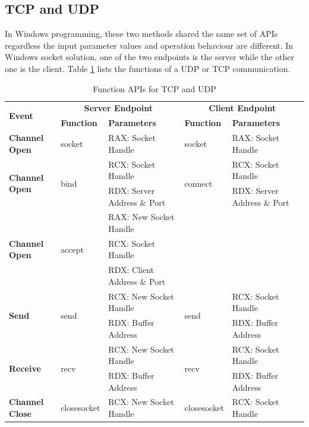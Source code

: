 \subsection{TCP and UDP}
In Windows programming, these two methods shared the same set of APIs regardless the input parameter values and operation behaviour are different. In Windows socket solution, one of the two endpoints is the server while the other one is the client. Table \ref{tcpupdfunctions} lists the functions of a UDP or TCP communication. 
  \begin{table}[H]
        \centering
        \caption{Function APIs for TCP and UDP}
        \label{tcpupdfunctions}
        \begin{tabular}{|l|l|l|l|l|}
            \hline
             \multirow{2}{*}{\textbf{Event}} &
               \multicolumn{2}{c|}{\textbf{Server Endpoint}} &
               \multicolumn{2}{c|}{\textbf{Client Endpoint}} \\
             \cline{2-5}
              & \textbf{Function}& \textbf{Parameters} & \textbf{Function} & \textbf{Parameters}  \\
             \hline
             \textbf{Channel Open}
             &socket&  RAX: Socket Handle & socket &  RAX: Socket Handle\\
             \hline
                \multirow{2}{*}{{\textbf{Channel Open}}}
              &\multirow{2}{*}{{bind}} &  RCX: Socket Handle & \multirow{2}{*}{connect} &  RCX: Socket Handle\\
              \cline{3-3} \cline{5-5}
             &&  RDX: Server Address $\&$ Port &  &  RDX: Server Address $\&$ Port\\
            \hline
                \multirow{3}{*}{{\textbf{Channel Open}}}
             &\multirow{3}{*}{{accept}} &  RAX: New Socket Handle && \\
              \cline{3-3} 
             &&  RCX:  Socket Handle &  & \\
             \cline{3-3} 
             &&  RDX: Client Address $\&$ Port &  &  \\
            \hline
             \multirow{2}{*}{{\textbf{Send}}}
             &\multirow{2}{*}{send} &  RCX: New Socket Handle & \multirow{2}{*}{send} &  RCX: Socket Handle\\
              \cline{3-3} \cline{5-5}
             &&  RDX: Buffer Address &  &  RDX: Buffer Address\\
           \hline
              \multirow{2}{*}{{\textbf{Receive}}}
             & \multirow{2}{*}{recv}&  RCX: New Socket Handle & \multirow{2}{*}{recv} &  RCX: Socket Handle\\
              \cline{3-3} \cline{5-5}
              &&  RDX: Buffer Address &  &  RDX: Buffer Address\\
            \hline
          {{\textbf{Channel Close}}}&
            {closesocket} & {RCX: New Socket Handle} &{closesocket} & {RCX: Socket Handle}\\
            \hline
        \end{tabular}
    \end{table} 
    
